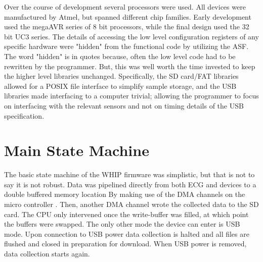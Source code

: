 Over the course of development several processors were used. All devices were manufactured by Atmel, but spanned different chip families. Early development used the megaAVR series of 8 bit processors, while the final design used the 32 bit UC3 series. The details of accessing the low level configuration registers of any specific hardware were "hidden" from the functional code by utilizing the ASF. The word "hidden" is in quotes because, often the low level code had to be rewritten by the programmer. But, this was well worth the time invested to keep the higher level libraries unchanged. Specifically, the SD card/FAT libraries allowed for a POSIX file interface to simplify sample storage, and the USB libraries made interfacing to a computer trivial; allowing the programmer to focus on interfacing with the relevant sensors and not on timing details of the USB specification.

\section{Main State Machine}

The basic state machine of the WHIP firmware was simplistic, but that is not to say it is not robust. Data was pipelined directly from both ECG and  devices to a double buffered memory location By making use of the DMA channels on the micro controller . Then, another DMA channel wrote the collected data to the SD card. The CPU only intervened once the write-buffer was filled, at which point the buffers were swapped. The only other mode the device can enter is USB mode. Upon connection to USB power data collection is halted and all files are flushed and closed in preparation for download. When USB power is removed, data collection starts again. 

